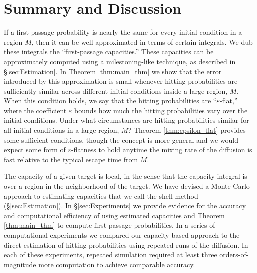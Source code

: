\documentclass[12pt, nofootinbib,english, amsmath, amssymb, aps, priprint, graphicx,floatfix]{revtex4-1}
\theoremstyle{plain}
\theoremstyle{definition}
\theoremstyle{plain}
\begin{document}
{\section{Summary and Discussion}
\label{sec:Discussion}

If a first-passage probability is nearly the same for every initial condition in a region $M$, then it can be well-approximated in terms of certain integrals.   We dub these integrals the ``first-passage capacities.''  These capacities can be approximately computed using a milestoning-like technique, as described in \S\ref{sec:Estimation}.  In Theorem \ref{thm:main_thm} we show that the error introduced by this approximation is small whenever hitting probabilities are sufficiently similar across different initial conditions inside a large region, $M$.  When this condition holds, we say that the hitting probabilities are ``$\varepsilon$-flat,'' where the coefficient $\varepsilon$ bounds  how much the hitting probabilities vary over the initial conditions.  Under what circumstances are hitting probabilities similar for all initial conditions in a large region, $M$?  Theorem \ref{thm:epsilon_flat} provides some sufficient conditions, though 
the concept is more general and we would expect some form
of $\varepsilon$-flatness to hold anytime the mixing rate of the diffusion is fast relative to the typical escape time from $M$.

The capacity of a given target is local, in the sense that the capacity integral is over a region in the neighborhood of the target. We have devised a Monte Carlo approach to estimating capacities that we call the shell method (\S\ref{sec:Estimation}).
In \S\ref{sec:Experiments} we provide evidence for the accuracy and computational efficiency of using estimated capacities and Theorem \ref{thm:main_thm} to compute 
first-passage probabilities. 
In a series of computational experiments we compared our capacity-based approach to the direct estimation of hitting probabilities using repeated runs of the diffusion. In each of these experiments, repeated simulation required at least three
orders-of-magnitude more computation to achieve comparable accuracy.

}
\end{document}
